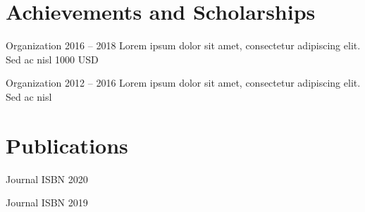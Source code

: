 \documentclass[english]{resume-template}
\begin{document}
\section{Achievements and Scholarships}
            {Organization}
            {2016 -- 2018}
            {
             Lorem ipsum dolor sit amet, consectetur adipiscing elit. Sed ac nisl
            }
            {1000 USD}

            {Organization}
            {2012 -- 2016}
            {
             Lorem ipsum dolor sit amet, consectetur adipiscing elit. Sed ac nisl
            }
            {}

\section{Publications}
            {Journal}
            {ISBN}
            {2020}

            {Journal}
            {ISBN}
            {2019}
\end{document}

